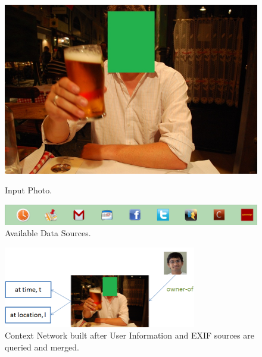 \begin{figure}[ht]
\begin{minipage}[b]{0.45\linewidth}
\centering
\includegraphics[width=\textwidth]{media/chapter4/stacktrace/torsten-hidden.png}
\caption{Input Photo.}
\label{fig:stacktrace-simple-torsten-hidden}
\end{minipage}
\hspace{0.5cm}
\begin{minipage}[b]{0.45\linewidth}
\centering
\includegraphics[width=\textwidth]{media/chapter4/stacktrace/sources.png}
\caption{Available Data Sources.}
\label{fig:stacktrace-simple-sources}
\end{minipage}
\end{figure}

\begin{figure}[h]
\centering
\includegraphics[width=0.75\textwidth]{media/chapter4/stacktrace/init-network.png}
\caption{Context Network built after User Information and EXIF sources are queried and merged.}
\label{fig:exif-network}
\end{figure}

